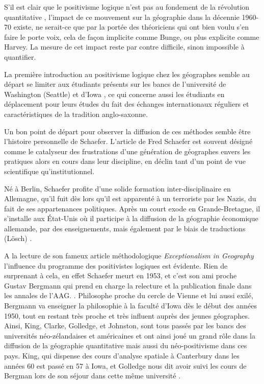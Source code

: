 S'il est clair que le positivisme logique n'est pas au fondement de la révolution quantitative \autocite{Claval2003}, l'impact de ce mouvement sur la géographie dans la décennie 1960-70 existe, ne serait-ce que par la portée des théoriciens qui ont bien voulu s'en faire le porte voix, cela de façon implicite comme Bunge, ou plus  explicite comme Harvey. La mesure de cet impact reste par contre difficile, sinon impossible à quantifier.

La première introduction au positivisme logique chez les géographes semble au départ se limiter aux étudiants présents sur les bancs de l'université de Washington (Seattle) et d'Iowa \autocite[554]{Barnes2001a} \autocite[120-121]{Unwin1992}, ce qui concerne aussi les étudiants en déplacement pour leurs études du fait des échanges internationaux réguliers et caractéristiques de la tradition anglo-saxonne.

Un bon point de départ pour observer la diffusion de ces méthodes semble être l'histoire personnelle de Schaefer. L'article de Fred Schaefer \autocite{Schaefer1953} est souvent désigné \autocite[15]{Louail2010} comme le catalyseur des frustrations d'une génération de géographes envers les pratiques alors en cours dans leur discipline, en déclin tant d'un point de vue scientifique qu’institutionnel.

Né à Berlin, Schaefer profite d'une solide formation inter-disciplinaire en Allemagne, qu'il fuit dès lors qu'il est apparenté à un terroriste par les Nazis, du fait de ses appartenances politiques. Après un court exode en Grande-Bretagne, il s'installe aux État-Unis où il participe à la diffusion de la géographie économique allemande, par des enseignements, mais également par le biais de traductions (Lösch) \autocite{Bunge1979}.

A la lecture de son fameux article méthodologique \textit{Exceptionalism in Geography} l'influence du programme des positivistes logiques est évidente. Rien de surprenant à cela, en effet Schaefer meurt en 1953, et c'est son ami proche Gustav Bergmann qui prend en charge la relecture et la publication finale dans les annales de l'AAG. \autocite[32]{Gregory1978}. Philosophe proche du cercle de Vienne et lui aussi exilé, Bergmann va enseigner la philosophie à la faculté d'Iowa dès le début des années 1950, tout en restant très proche et très influent auprès des jeunes géographes.\autocite[192]{Buttimer1983} Ainsi, King, Clarke, Golledge, et Johnston, sont tous passés par les bancs des universités néo-zélandaises et américaines et ont ainsi joué un grand rôle dans la diffusion de la géographie quantitative mais aussi du néo-positivisme dans ces pays. King, qui dispense des cours d'analyse spatiale à Canterbury dans les années 60 est passé en 57 à Iowa, et Golledge nous dit avoir suivi les cours de Bergman lors de son séjour dans cette même université \autocite[95-96]{Bailly2000} .

